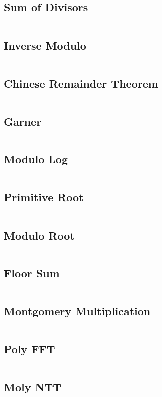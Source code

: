 \documentclass[a4paper, 8pt, landscape, oneside]{extarticle}
\begin{document}
\begin{multicols*}{3}
    	\subsection{Sum of Divisors}
    	\inputminted{cpp}{src/math/12-getsumdiv.hpp}
    	\subsection{Inverse Modulo}
    	\inputminted{cpp}{src/math/13-getinv.hpp}
    	\subsection{Chinese Remainder Theorem}
    	\inputminted{cpp}{src/math/14-chiremthm.hpp}
    	\subsection{Garner}
    	\inputminted{cpp}{src/math/15-garner.hpp}
    	\subsection{Modulo Log}
    	\inputminted{cpp}{src/math/16-modlog.hpp}
    	\subsection{Primitive Root}
    	\inputminted{cpp}{src/math/17-getprimroot.hpp}
    	\subsection{Modulo Root}
    	\inputminted{cpp}{src/math/18-modroot.hpp}
    	\subsection{Floor Sum}
    	\inputminted{cpp}{src/math/19-getfloorsum.hpp}
    	\subsection{Montgomery Multiplication}
    	\inputminted{cpp}{src/math/20-montgomery.hpp}
    	\subsection{Poly FFT}
    	\inputminted{cpp}{src/math/21-poly.hpp}
    	\subsection{Moly NTT}
    	\inputminted{cpp}{src/math/22-moly.hpp}

\end{multicols*}
\end{document}
